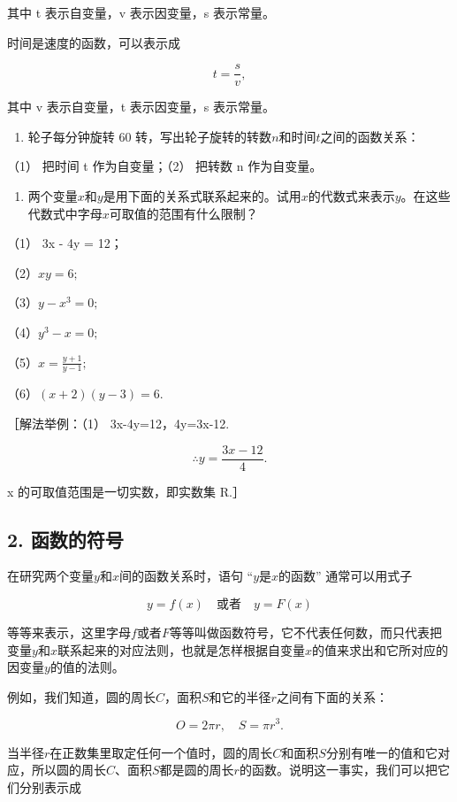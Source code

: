 其中 t 表示自变量，v 表示因变量，s 表示常量。

时间是速度的函数，可以表示成

\[
t = \frac{s}{v},
\]

其中 v 表示自变量，t 表示因变量，s 表示常量。

\begin{enumerate}
\item
  轮子每分钟旋转 60
  转，写出轮子旋转的转数\(n\)和时间\(t\)之间的函数关系：
\end{enumerate}

（1） 把时间 t 作为自变量；（2） 把转数 n 作为自变量。

\begin{enumerate}[start=2]
\item
  两个变量\(x\)和\(y\)是用下面的关系式联系起来的。试用\(x\)的代数式来表示\(y\)。在这些代数式中字母\(x\)可取值的范围有什么限制？
\end{enumerate}

（1） 3x - 4y = 12；

（2）\(xy = 6;\)

（3）\(y - x^{3} = 0;\)

（4）\(y^{3}-x=0;\)

（5）\(x = \frac{y + 1}{y - 1};\)

（6）\((x + 2)(y - 3) = 6.\)

［解法举例：（1） 3x-4y=12，4y=3x-12.

\[
\therefore y = \frac{3 x - 12}{4}.
\]

x 的可取值范围是一切实数，即实数集 R.］

\subsection{2. 函数的符号}

在研究两个变量\(y\)和\(x\)间的函数关系时，语句 ``\(y\)是\(x\)的函数''
通常可以用式子

\[
y = f (x) \quad \text{或者} \quad y = F (x)
\]

等等来表示，这里字母\(f\)或者\(F\)等等叫做函数符号，它不代表任何数，而只代表把变量\(y\)和\(x\)联系起来的对应法则，也就是怎样根据自变量\(x\)的值来求出和它所对应的因变量\(y\)的值的法则。

例如，我们知道，圆的周长\(C\)，面积\(S\)和它的半径\(r\)之间有下面的关系：

\[
O = 2 \pi r, \quad S = \pi r^{3}.
\]

当半径\(r\)在正数集里取定任何一个值时，圆的周长\(C\)和面积\(S\)分别有唯一的值和它对应，所以圆的周长\(C\)、面积\(S\)都是圆的周长\(r\)的函数。说明这一事实，我们可以把它们分别表示成

